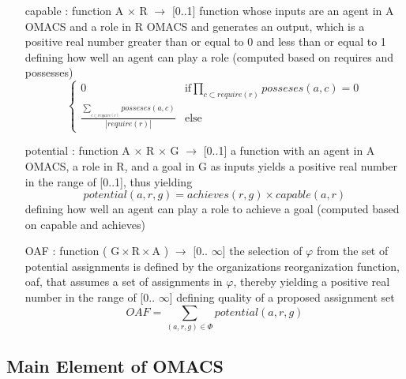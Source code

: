 \begin{itemize}
\newcommand{\localtextbulletone}{\textcolor{gray}{\raisebox{.45ex}{\rule{.6ex}{.6ex}}}}
\renewcommand{\labelitemi}{\localtextbulletone}
\item[capable] 
: function A $\times$ R $\rightarrow$ {[}0..1{]} function whose inputs are an agent in A OMACS
and a role in R OMACS and generates an output, which is a positive real number greater than or equal to 0 
and less than or equal to 1
defining how well an agent can play a role (computed based on requires and possesses)
\begin{equation}
\begin{cases}
0 & \textrm{if}\prod_{c\subset require(r)}posseses(a,c)=0\\
\frac{\sum_{_{c\subset require(r)}}posseses(a,c) }{|require(r)|} & \textrm{else}
\end{cases}\label{eq:capable equation}
\end{equation}

\item[potential]
: function A $\times$ R $\times$ G $\rightarrow$ {[}0..1{]} a function with an agent in A OMACS,
a role in R, and a goal in G as inputs yields a positive real number in the range of {[}0..1{]}, 
thus yielding	
\begin{equation}
potential(a,r,g)=achieves(r,g)\times capable(a,r) \label{eq:potential equation}
\end{equation}
defining how well an agent can play a role to achieve a goal (computed based on capable and achieves)

\item[ OAF ] 
: function ( $ \textrm{G} \times \textrm{R} \times \textrm{A} $ ) $\rightarrow$ {[}0.. $\infty${]} 
the selection of $\varphi$ from the set of potential assignments is defined by the organizations reorganization function,
 oaf, that assumes a set of assignments in $\varphi$,
thereby yielding a positive real number in the range of {[}0.. $\infty${]}
defining quality of a proposed assignment set
\begin{equation}
OAF=\sum_{(a,r,g)\in\varPhi}potential(a,r,g)\label{eq:oaf equation}
\end{equation}


\end{itemize}

\subsection{Main Element of OMACS}

